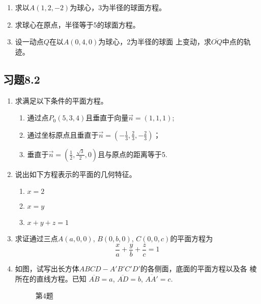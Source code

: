 \begin{ex}
\begin{enumerate}
    \item 求以$A(1,2,-2)$为球心，3为半径的球面方程。
    \item 求球心在原点，半径等于5的球面方程。
    \item 设一动点$Q$在以$A(0,4,0)$为球心，2为半径的球面
    上变动，求$\overline{OQ}$中点的轨迹。
\end{enumerate}
\end{ex}

\subsection*{习题8.2}
\begin{enumerate}
    \item 求满足以下条件的平面方程。
\begin{enumerate}
\item 通过点$P_0(5,3,4)$且垂直于向量$\vec{n}=(1,1,1)$;
\item 通过坐标原点且垂直于$\vec{n}=\left(-\frac{1}{3},\frac{2}{3},-\frac{2}{3}\right)$；
\item 垂直于$\vec{n}=\left(\frac{1}{2},\frac{\sqrt{3}}{2},0\right)$且与原点的距离等于5.
\end{enumerate}

    \item 说出如下方程表示的平面的几何特征。
\begin{multicols}{3}
\begin{enumerate}
    \item $x=2$ \item $x=y$ \item $x+y+z=1$
\end{enumerate}
\end{multicols}

    \item 求证通过三点$A(a,0,0)$, $B(0,b,0)$, $C(0,
    0,c)$的平面方程为
\[\frac{x}{a}+\frac{y}{b}+\frac{z}{c}=1\] 

\item 如图，试写出长方体$ABC
D-A'B'C'D'$的各侧面，底面的平面方程以及各
棱所在的直线方程。已知
$\overline{AB}=a$, $\overline{AD}=b$, 
$\overline{AA'}=c$.

\begin{figure}[htp]
    \centering
{}
    \caption*{第4题}
\end{figure}



\end{enumerate}
